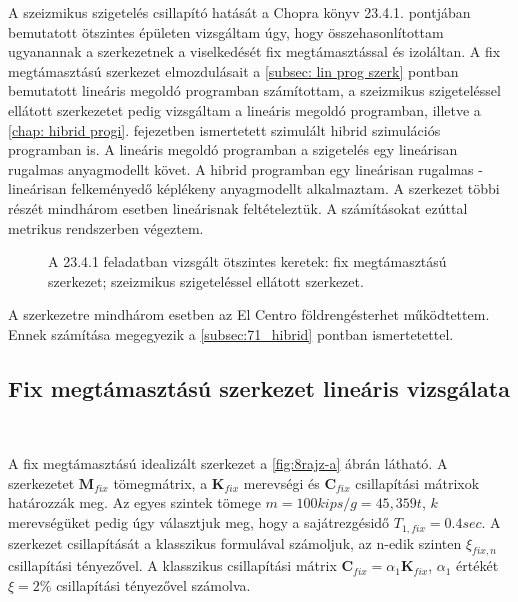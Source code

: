 A szeizmikus szigetelés csillapító hatását a Chopra könyv \cite{chopra} 23.4.1. pontjában bemutatott ötszintes épületen vizsgáltam  úgy, hogy összehasonlítottam ugyanannak  a szerkezetnek a viselkedését fix megtámasztással és  izoláltan.  A  fix megtámasztású szerkezet elmozdulásait   a \ref{subsec: lin prog szerk} pontban bemutatott  lineáris megoldó programban számítottam,  a szeizmikus szigeteléssel ellátott szerkezetet pedig vizsgáltam a lineáris megoldó programban, illetve a \ref{chap: hibrid progi}. fejezetben ismertetett szimulált hibrid szimulációs programban is. A lineáris megoldó programban  a szigetelés egy lineárisan rugalmas anyagmodellt követ. A hibrid programban egy lineárisan rugalmas - lineárisan felkeményedő képlékeny anyagmodellt alkalmaztam.  A szerkezet többi részét mindhárom esetben lineárisnak feltételeztük. A számításokat ezúttal metrikus rendszerben végeztem.


\begin{figure}%
\centering
{}%
\hspace{8pt}%
%
\caption[A \cite{chopra} 23.4.1 feladatban vizsgált ötszintes keretek.]{A \cite{chopra} 23.4.1 feladatban vizsgált ötszintes keretek: 
 fix megtámasztású szerkezet;
 szeizmikus szigeteléssel ellátott szerkezet.}
 \label{fig:8rajz}%
\end{figure}


A szerkezetre mindhárom esetben az El Centro földrengésterhet működtettem. Ennek számítása megegyezik a \ref{subsec:71_hibrid} pontban ismertetettel.


\subsection{Fix megtámasztású szerkezet  lineáris vizsgálata}

{\ }

A fix megtámasztású idealizált szerkezet  a \ref{fig:8rajz-a} ábrán látható. A szerkezetet $\mathbf{M}_{fix}$ tömegmátrix, a $\mathbf{K}_{fix}$ merevségi és $\mathbf{C}_{fix}$ csillapítási mátrixok határozzák meg. Az egyes szintek tömege $m = 100 kips/g = 45,359 t$,  $k$ merevségüket pedig úgy választjuk meg, hogy  a sajátrezgésidő $T_{1,fix} = 0.4 sec$. A szerkezet csillapítását a klasszikus formulával számoljuk, az n-edik szinten $\xi_{fix,n}$ csillapítási tényezővel. A klasszikus csillapítási mátrix $\mathbf{C}_{fix} = \alpha_1\mathbf{K}_{fix}$, $\alpha_1$ értékét $\xi = 2\%$  csillapítási tényezővel számolva.  

